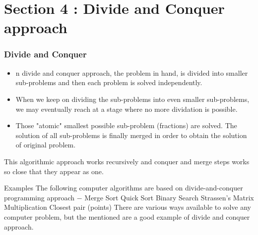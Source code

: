 \documentclass[algocomplexity.tex]{subfiles}
\begin{document}
\section{Section 4 : Divide and Conquer approach}
\begin{frame}
	\frametitle{Divide and Conquer}
	\large
	\begin{itemize}
		\item n divide and conquer approach, the problem in hand, is divided into smaller sub-problems and then each problem is solved independently. 
		\item When we keep on dividing the sub-problems into even smaller sub-problems, we may eventually reach at a stage where no more dividation is possible. 
		\item Those "atomic" smallest possible sub-problem (fractions) are solved. The solution of all sub-problems is finally merged in order to obtain the solution of original problem.
	\end{itemize}
\end{frame}

\begin{frame}
	This algorithmic approach works recursively and conquer and merge steps works so close that they appear as one.
	
	
\end{frame}
\begin{frame}
	Examples
	The following computer algorithms are based on divide-and-conquer programming approach −
	Merge Sort
	Quick Sort
	Binary Search
	Strassen's Matrix Multiplication
	Closest pair (points)
	There are various ways available to solve any computer problem, but the mentioned are a good example of divide and conquer approach.
	
\end{frame}
\end{document}
